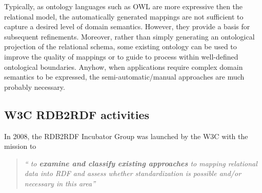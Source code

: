 \documentclass[11pt]{llncs}
\newcommand{\labelsec}[1]{\label{sec:#1}}
\begin{document}
Typically, as ontology languages such as OWL are more expressive then the relational model, 
 the automatically generated mappings are not sufficient to capture a desired level of domain semantics.
However, they provide a basis for subsequent refinements.
Moreover, rather than simply generating an ontological projection of the relational schema, some existing
 ontology can be used to improve the quality of mappings or to guide to process within well-defined ontological boundaries.
Anyhow, when applications require complex domain semantics to be expressed, 
 the semi-automatic/manual approaches are much probably necessary. 
 

\subsection{W3C RDB2RDF activities}
\labelsec{w3activity}
In 2008, the RDB2RDF Incubator Group was launched by the W3C with the mission to

\begin{quote}
 \textit{``
to \textbf{examine and classify existing approaches} to mapping relational data into RDF and 
assess whether standardization is possible and/or necessary in this area''}
\end{quote}
\end{document}
